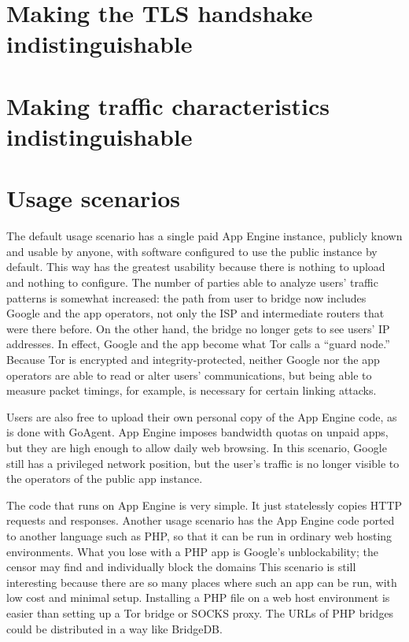 \documentclass{article}
\begin{document}

\section{Making the TLS handshake indistinguishable}
\label{sec:browserextension}


\section{Making traffic characteristics indistinguishable}
\label{sec:trafficstatistics}

\section{Usage scenarios}

The default usage scenario has a single paid App Engine instance, publicly known and usable by anyone,
with software configured to use the public instance by default.
This way has the greatest usability because there is nothing to upload and nothing to configure.
The number of parties able to analyze users' traffic patterns is somewhat increased:
the path from user to bridge now includes Google and the app operators, not only the ISP and intermediate routers that were there before.
On the other hand, the bridge no longer gets to see users' IP addresses.
In effect, Google and the app become what Tor calls a ``guard node.''
Because Tor is encrypted and integrity-protected, neither Google nor the app operators
are able to read or alter users' communications, but being able to measure packet timings,
for example, is necessary for certain linking attacks.

Users are also free to upload their own personal copy of the App Engine code, as is done with GoAgent.
App Engine imposes bandwidth quotas on unpaid apps, but they are high enough to allow daily web browsing.
In this scenario, Google still has a privileged network position,
but the user's traffic is no longer visible to the operators of the public app instance.

The code that runs on App Engine is very simple.
It just statelessly copies HTTP requests and responses.
Another usage scenario has the App Engine code ported to another language such as PHP,
so that it can be run in ordinary web hosting environments.
What you lose with a PHP app is Google's unblockability;
the censor may find and individually block the domains
This scenario is still interesting because there are so many places
where such an app can be run, with low cost and minimal setup.
Installing a PHP file on a web host environment is easier than setting up a Tor bridge or SOCKS proxy.
The URLs of PHP bridges could be distributed in a way like BridgeDB.
\end{document}
